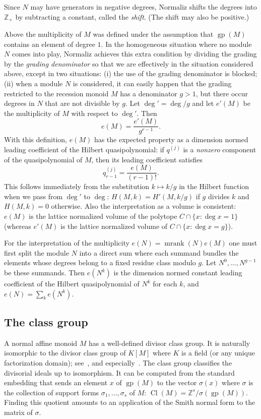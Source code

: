 \documentclass[12pt,a4paper]{scrartcl}
\theoremstyle{definition}
\def\ZZ{{\mathbb Z}}
\DeclareMathOperator{\gp}{gp}
\DeclareMathOperator{\mrank}{mrank}
\DeclareMathOperator{\Cl}{Cl}
\begin{document}
Since $N$ may have generators in negative degrees, Normaliz shifts the degrees into $\ZZ_+$ by subtracting a constant, called the \emph{shift}. (The shift may also be positive.)

Above the multiplicity of $M$ was defined under the assumption that $\gp(M)$ contains an element of degree $1$. In the homogeneous situation where no module $N$ comes into play, Normaliz achieves this extra condition by dividing the grading by the \emph{grading denominator} so that we are effectively in the situation considered above, except in two situations:
(i) the use of the grading denominator is blocked; (ii) when a module $N$ is considered, it can easily happen that the grading restricted to the recession monoid $M$ has a denominator $g>1$, but there occur degrees in $N$ that are not divisible by $g$. Let $\deg'=\deg/g$ and let $e'(M)$ be the multiplicity of $M$ with respect to $\deg'$. Then
$$
e(M)=\frac{e'(M)}{g^{r-1}}.
$$
With this definition, $e(M)$ has the expected property as a dimension normed leading coefficient of the Hilbert quasipolynomial: if $q^{(j)}$ is a \emph{nonzero} component of the quasipolynomial of $M$, then its leading coefficient satisfies
$$
q_{r-1}^{(j)}=\frac{e(M)}{(r-1)!}.
$$
This follows immediately from the substitution $k\mapsto k/g$ in the Hilbert function when we pass from $\deg'$ to $\deg$: $H(M,k)=H'(M,k/g)$ if $g$ divides $k$ and $H(M,k)=0$ otherwise. Also the interpretation as a volume is consistent: $e(M)$ is the lattice normalized volume of the polytope $C\cap\{x:\deg x=1 \}$ (whereas $e'(M)$ is the lattice normalized volume of $C\cap\{x:\deg x=g \}$).

For the interpretation of the multiplicity $e(N)=\mrank(N)e(M)$ one must first split the module $N$ into a direct sum where each summand bundles the elements whose degrees belong to a fixed residue class modulo $g$. Let $N^0,\dots,N^{g-1}$ be these summands. Then $e(N^k)$ is the dimension normed constant leading coefficient of the Hilbert quasipolynomial of $N^k$ for each $k$, and $e(N)=\sum_k e(N^k)$.

\subsection{The class group}

A normal affine monoid $M$ has a well-defined divisor class group. It is naturally isomorphic to the divisor class group of $K[M]$ where $K$ is a field (or any unique factorization domain); see~\cite[Section~4.F]{BG}, and especially~\cite[Corollary~4.56]{BG}. The class group classifies the divisorial ideals up to isomorphism. It can be computed from the standard embedding that sends an element $x$ of $\gp(M)$ to the vector $\sigma(x)$ where $\sigma$ is the collection of support forms $\sigma_1,\dots,\sigma_s$ of $M$: $\Cl(M)=\ZZ^s/\sigma(\gp(M))$. Finding this quotient amounts to an application of the Smith normal form to the matrix of $\sigma$.
\end{document}

